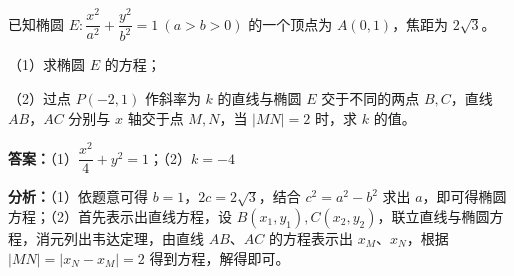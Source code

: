 \begin{question}[points=15]
已知椭圆 $E: \dfrac{x^2}{a^2} + \dfrac{y^2}{b^2} = 1\ (a>b>0)$ 的一个顶点为 $A(0,1)$，焦距为 $2\sqrt{3}$。

（1）求椭圆 $E$ 的方程；

（2）过点 $P(-2,1)$ 作斜率为 $k$ 的直线与椭圆 $E$ 交于不同的两点 $B,C$，直线 $AB$，$AC$ 分别与 $x$ 轴交于点 $M,N$，当 $|MN|=2$ 时，求 $k$ 的值。
\begin{solution}
\textbf{答案：}（1）$\dfrac{x^2}{4}+y^2=1$；（2）$k=-4$

\textbf{分析：}（1）依题意可得 $b=1$，$2c=2\sqrt{3}$，结合 $c^2=a^2-b^2$ 求出 $a$，即可得椭圆方程；（2）首先表示出直线方程，设 $B(x_1,y_1),C(x_2,y_2)$，联立直线与椭圆方程，消元列出韦达定理，由直线 $AB$、$AC$ 的方程表示出 $x_M$、$x_N$，根据 $|MN|=|x_N-x_M|=2$ 得到方程，解得即可。


\end{solution}
\end{question}
